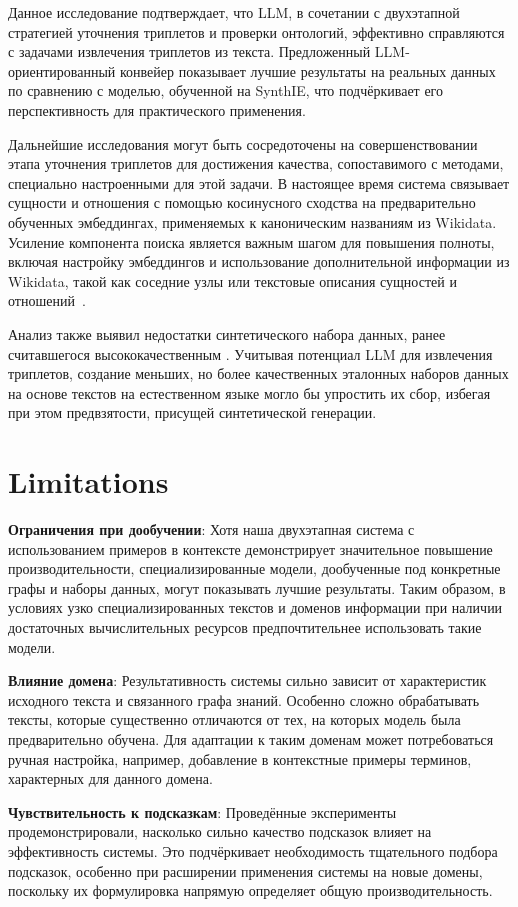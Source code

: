 Данное исследование подтверждает, что LLM, в сочетании с двухэтапной стратегией уточнения триплетов и проверки онтологий, эффективно справляются с задачами извлечения триплетов из текста. Предложенный LLM-ориентированный конвейер показывает лучшие результаты на реальных данных по сравнению с моделью, обученной на SynthIE, что подчёркивает его перспективность для практического применения.

Дальнейшие исследования могут быть сосредоточены на совершенствовании этапа уточнения триплетов для достижения качества, сопоставимого с методами, специально настроенными для этой задачи. В настоящее время система связывает сущности и отношения с помощью косинусного сходства на предварительно обученных эмбеддингах, применяемых к каноническим названиям из Wikidata. Усиление компонента поиска является важным шагом для повышения полноты, включая настройку эмбеддингов и использование дополнительной информации из Wikidata, такой как соседние узлы или текстовые описания сущностей и отношений~\cite{kochsiek2023friendly,chepurova-etal-2023-better}.

Анализ также выявил недостатки синтетического набора данных, ранее считавшегося высококачественным \cite{josifoski2023exploiting}. Учитывая потенциал LLM для извлечения триплетов, создание меньших, но более качественных эталонных наборов данных на основе текстов на естественном языке могло бы упростить их сбор, избегая при этом предвзятости, присущей синтетической генерации.

\section*{Limitations}

\textbf{Ограничения при дообучении}: Хотя наша двухэтапная система с использованием примеров в контексте демонстрирует значительное повышение производительности, специализированные модели, дообученные под конкретные графы и наборы данных, могут показывать лучшие результаты. Таким образом, в условиях узко специализированных текстов и доменов информации при наличии достаточных вычислительных ресурсов предпочтительнее использовать такие модели.

\textbf{Влияние домена}: Результативность системы сильно зависит от характеристик исходного текста и связанного графа знаний. Особенно сложно обрабатывать тексты, которые существенно отличаются от тех, на которых модель была предварительно обучена. Для адаптации к таким доменам может потребоваться ручная настройка, например, добавление в контекстные примеры терминов, характерных для данного домена.

\textbf{Чувствительность к подсказкам}: Проведённые эксперименты продемонстрировали, насколько сильно качество подсказок влияет на эффективность системы. Это подчёркивает необходимость тщательного подбора подсказок, особенно при расширении применения системы на новые домены, поскольку их формулировка напрямую определяет общую производительность.